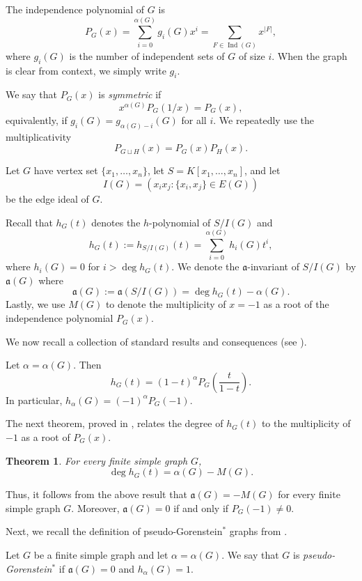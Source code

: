 \documentclass[12pt]{amsart}
\theoremstyle{plain}
\newtheorem{thm}{Theorem}[section]
\theoremstyle{definition}
\DeclareMathOperator{\Ind}{Ind}
\begin{document}
The independence polynomial of \(G\) is
\[
P_G(x)=\sum_{i=0}^{\alpha(G)} g_i(G)x^i
      =\sum_{F\in \Ind(G)} x^{|F|},
\]
where \(g_i(G)\) is the number of independent sets of \(G\) of size \(i\).
When the graph is clear from context, we simply write \(g_i\).



We say that \(P_G(x)\) is \emph{symmetric} if
\[
x^{\alpha(G)}P_G(1/x)=P_G(x),
\]
equivalently, if \(g_i(G)=g_{\alpha(G)-i}(G)\) for all \(i\).
We repeatedly use the multiplicativity
\[
P_{G\sqcup H}(x)=P_G(x)P_H(x).
\]

Let \(G\) have vertex set \(\{x_1,\dots,x_n\}\), let
\(S=K[x_1,\dots,x_n]\), and let
\[
I(G)=(x_ix_j:\{x_i,x_j\}\in E(G))
\]
be the edge ideal of \(G\). 


Recall that $h_G(t)$ denotes the $h$-polynomial of $S/I(G)$ and 
\[
h_G(t):=h_{S/I(G)}(t)=\sum_{i=0}^{\alpha(G)} h_i(G)t^i,
\]
where \(h_i(G)=0\) for \(i>\deg h_G(t)\).
We denote the $\mathfrak a$-invariant of $S/I(G)$ by $\mathfrak a(G)$ where
\[
\mathfrak a(G):=\mathfrak a(S/I(G))=\deg h_G(t)-\alpha(G).
\]
Lastly, we use $M(G)$ to denote the multiplicity of $x=-1$ as a root of the independence polynomial $P_G(x)$.


We now recall a collection of standard results and consequences (see \cite{hibi2026pseudogorensteingraphs}).
\begin{prop}\label{prop:h-from-independence}
Let \(\alpha=\alpha(G)\). Then
\[
h_G(t)=(1-t)^{\alpha}P_G\!\left(\frac{t}{1-t}\right).
\]
In particular, \(h_{\alpha}(G)=(-1)^{\alpha}P_G(-1)\).
\end{prop}


The next theorem, proved in \cite[Theorem 4.4]{biermann2026}, relates the degree
of \(h_G(t)\) to the multiplicity of \(-1\) as a root of \(P_G(x)\).

\begin{thm}\cite[Theorem 4.4]{biermann2026}\label{thm:deg-via-ord}
For every finite simple graph \(G\),
\[
\deg h_G(t)=\alpha(G)-M(G).
\]
\end{thm}

Thus, it follows from the above result that   $\mathfrak a(G)=-M(G)$ for every finite simple graph \(G\).  Moreover, $\mathfrak a(G)=0$ if and only if $P_G(-1)\neq 0$.


Next, we recall the definition of pseudo-Gorenstein\(^{*}\) graphs from \cite{hibi2026pseudogorensteingraphs}.

\begin{defn}
Let \(G\) be a finite simple graph and let \(\alpha=\alpha(G)\).
We say that \(G\) is \emph{pseudo-Gorenstein\(^{*}\)} if $\mathfrak a(G)=0$ and $h_{\alpha}(G)=1$.
\end{defn}
\end{document}
